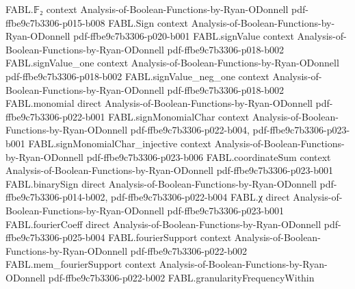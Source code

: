 \begin{theorem}
\label{FABL.expect_fourierCoeff_empty_randomRestriction}
\leanok
{}
\proofstep
  {FABL.𝔽₂}
  {context}
  {Analysis-of-Boolean-Functions-by-Ryan-ODonnell}
  {pdf-ffbe9c7b3306-p015-b008}
\proofstep
  {FABL.Sign}
  {context}
  {Analysis-of-Boolean-Functions-by-Ryan-ODonnell}
  {pdf-ffbe9c7b3306-p020-b001}
\proofstep
  {FABL.signValue}
  {context}
  {Analysis-of-Boolean-Functions-by-Ryan-ODonnell}
  {pdf-ffbe9c7b3306-p018-b002}
\proofstep
  {FABL.signValue_one}
  {context}
  {Analysis-of-Boolean-Functions-by-Ryan-ODonnell}
  {pdf-ffbe9c7b3306-p018-b002}
\proofstep
  {FABL.signValue_neg_one}
  {context}
  {Analysis-of-Boolean-Functions-by-Ryan-ODonnell}
  {pdf-ffbe9c7b3306-p018-b002}
\proofstep
  {FABL.monomial}
  {direct}
  {Analysis-of-Boolean-Functions-by-Ryan-ODonnell}
  {pdf-ffbe9c7b3306-p022-b001}
\proofstep
  {FABL.signMonomialChar}
  {context}
  {Analysis-of-Boolean-Functions-by-Ryan-ODonnell}
  {pdf-ffbe9c7b3306-p022-b004,
    pdf-ffbe9c7b3306-p023-b001}
\proofstep
  {FABL.signMonomialChar_injective}
  {context}
  {Analysis-of-Boolean-Functions-by-Ryan-ODonnell}
  {pdf-ffbe9c7b3306-p023-b006}
\proofstep
  {FABL.coordinateSum}
  {context}
  {Analysis-of-Boolean-Functions-by-Ryan-ODonnell}
  {pdf-ffbe9c7b3306-p023-b001}
\proofstep
  {FABL.binarySign}
  {direct}
  {Analysis-of-Boolean-Functions-by-Ryan-ODonnell}
  {pdf-ffbe9c7b3306-p014-b002,
    pdf-ffbe9c7b3306-p022-b004}
\proofstep
  {FABL.χ}
  {direct}
  {Analysis-of-Boolean-Functions-by-Ryan-ODonnell}
  {pdf-ffbe9c7b3306-p023-b001}
\proofstep
  {FABL.fourierCoeff}
  {direct}
  {Analysis-of-Boolean-Functions-by-Ryan-ODonnell}
  {pdf-ffbe9c7b3306-p025-b004}
\proofstep
  {FABL.fourierSupport}
  {context}
  {Analysis-of-Boolean-Functions-by-Ryan-ODonnell}
  {pdf-ffbe9c7b3306-p022-b002}
\proofstep
  {FABL.mem_fourierSupport}
  {context}
  {Analysis-of-Boolean-Functions-by-Ryan-ODonnell}
  {pdf-ffbe9c7b3306-p022-b002}
\proofstep
  {FABL.granularityFrequencyWithin}

\end{theorem}
